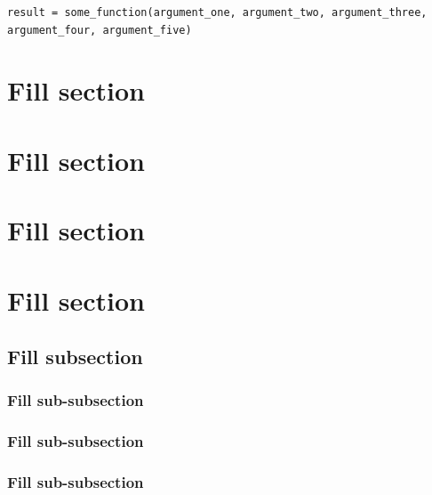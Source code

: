 \begin{lstlisting}[caption={Long line wrapping example}, label={lst:wrap}]
result = some_function(argument_one, argument_two, argument_three, argument_four, argument_five)
\end{lstlisting}

\lipsum[1]

\section{Fill section}

\lipsum[2-3]


\section{Fill section}

\lipsum[2-3]


\section{Fill section}

\lipsum[2-3]


\section{Fill section}

\lipsum[2]

\subsection{Fill subsection}

\lipsum[2]

\subsubsection{Fill sub-subsection}

\lipsum[4]

\subsubsection{Fill sub-subsection}

\lipsum[4]

\subsubsection{Fill sub-subsection}

\lipsum[4]

